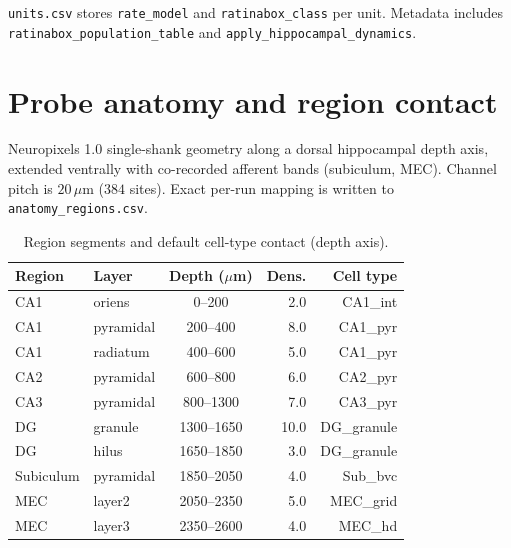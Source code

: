 \documentclass[11pt,a4paper]{article}
\begin{document}
\texttt{units.csv} stores \texttt{rate\_model} and \texttt{ratinabox\_class} per unit.
Metadata includes \texttt{ratinabox\_population\_table} and \texttt{apply\_hippocampal\_dynamics}.

\section{Probe anatomy and region contact}
\label{sec:anatomy}

Neuropixels 1.0 single-shank geometry along a dorsal hippocampal depth axis, extended ventrally with co-recorded afferent bands (subiculum, MEC).
Channel pitch is $20\,\mu\mathrm{m}$ ($384$ sites).
Exact per-run mapping is written to \texttt{anatomy\_regions.csv}.

\begin{table}[h]
\centering
\caption{Region segments and default cell-type contact (depth axis).}
\label{tab:anatomy}
\small
\begin{tabular}{@{}llcrr@{}}
\toprule
Region & Layer & Depth ($\mu$m) & Dens. & Cell type \\
\midrule
CA1 & oriens & 0--200 & 2.0 & CA1\_int \\
CA1 & pyramidal & 200--400 & 8.0 & CA1\_pyr \\
CA1 & radiatum & 400--600 & 5.0 & CA1\_pyr \\
CA2 & pyramidal & 600--800 & 6.0 & CA2\_pyr \\
CA3 & pyramidal & 800--1300 & 7.0 & CA3\_pyr \\
DG & granule & 1300--1650 & 10.0 & DG\_granule \\
DG & hilus & 1650--1850 & 3.0 & DG\_granule \\
Subiculum & pyramidal & 1850--2050 & 4.0 & Sub\_bvc \\
MEC & layer2 & 2050--2350 & 5.0 & MEC\_grid \\
MEC & layer3 & 2350--2600 & 4.0 & MEC\_hd \\
\bottomrule
\end{tabular}
\end{table}
\end{document}
